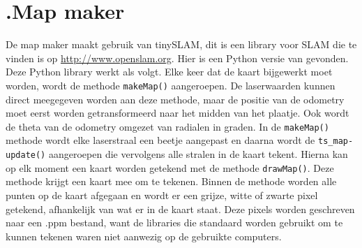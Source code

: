 \documentclass[a4paper,10pt]{article}
\begin{document}
\section*{\label{mapmaker}\thesection.\quad Map maker}
De map maker maakt gebruik van tinySLAM, dit is een library voor SLAM die te vinden is op \url{http://www.openslam.org}\cite{openSLAM,CoreSLAM:article}.
Hier is een Python versie \cite{CoreSLAM:python} 
van gevonden. Deze Python library werkt als volgt. Elke keer dat de kaart bijgewerkt moet worden, wordt de methode \verb!makeMap()! aangeroepen. De laserwaarden kunnen direct meegegeven worden aan deze methode, maar de positie van de
odometry moet eerst worden getransformeerd naar het midden van het plaatje. Ook wordt de theta van de odometry omgezet van radialen in graden. In de \verb!makeMap()! methode wordt elke laserstraal een beetje aangepast en daarna wordt de \verb!ts_map-update()! aangeroepen die vervolgens alle stralen in de kaart tekent. Hierna kan op elk moment een kaart worden getekend met de methode \verb!drawMap()!. Deze methode krijgt een kaart mee om te tekenen. Binnen de methode worden alle punten op de kaart afgegaan en wordt er een grijze, witte of zwarte pixel getekend, afhankelijk van wat er in de kaart staat. Deze pixels worden geschreven naar een .ppm bestand, want de libraries die standaard worden gebruikt om te kunnen tekenen waren niet aanwezig op de gebruikte computers.
\end{document}
